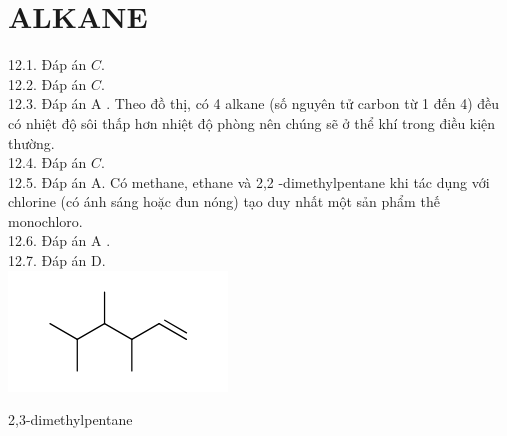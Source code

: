 \documentclass[10pt]{article}
\begin{document}
\section*{ALKANE}
12.1. Đáp án $C$.\\
12.2. Đáp án $C$.\\
12.3. Đáp án A . Theo đồ thị, có 4 alkane (số nguyên tử carbon từ 1 đến 4) đều có nhiệt độ sôi thấp hơn nhiệt độ phòng nên chúng sẽ ở thể khí trong điều kiện thường.\\
12.4. Đáp án $C$.\\
12.5. Đáp án A. Có methane, ethane và 2,2 -dimethylpentane khi tác dụng với chlorine (có ánh sáng hoặc đun nóng) tạo duy nhất một sản phẩm thế monochloro.\\
12.6. Đáp án A .\\
12.7. Đáp án D.\\
\includegraphics{smile-40126ffb2780a7e1387cff9609c8288e60339d29}

2,3-dimethylpentane
\end{document}
